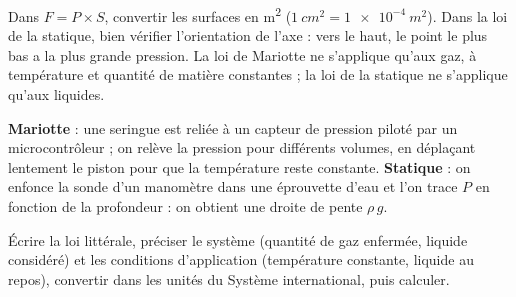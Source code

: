 \begin{attention}
Dans $F=P\times S$, convertir les surfaces en \unit{m^2} ($\qty{1}{cm^2}=\qty{1e-4}{m^2}$). Dans la loi de la statique, bien vérifier
l'orientation de l'axe : vers le haut, le point le plus bas a la plus grande pression. La loi de Mariotte ne s'applique qu'aux
gaz, à température et quantité de matière constantes ; la loi de la statique ne s'applique qu'aux liquides.
\end{attention}
\begin{experience}
\textbf{Mariotte} : une seringue est reliée à un capteur de pression piloté par un microcontrôleur ; on relève la pression pour
différents volumes, en déplaçant lentement le piston pour que la température reste constante. \textbf{Statique} : on
enfonce la sonde d'un manomètre dans une éprouvette d'eau et l'on trace $P$ en fonction de la profondeur : on obtient
une droite de pente $\rho\,g$.
\end{experience}
\begin{rediger}
Écrire la loi littérale, préciser le système (quantité de gaz enfermée, liquide considéré) et les conditions d'application
(température constante, liquide au repos), convertir dans les unités du Système international, puis calculer.
\end{rediger}
\exercices

